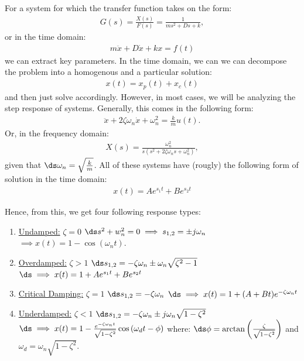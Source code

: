 \documentclass{article}
\begin{document}


For a system for which the transfer function takes on the form:
\begin{align*}
  G(s) = \frac{X(s)}{F(s)} = \frac{1}{ms^2 + Ds + k},
\end{align*}
or in the time domain:
\begin{align*}
  m\ddot{x} + D\dot{x} + kx = f(t)
\end{align*}
we can extract key parameters.
\gap
{}
In the time domain, we can we can decompose the problem into a homogenous and a particular solution:
\begin{align*}
  x(t) = x_p(t) + x_c(t)
\end{align*}
and then just solve accordingly. However, in most cases, we will be analyzing the step
response of systems. Generally, this comes in the following form:
\begin{align*}
  \ddot{x} + 2\zeta \omega_n \dot{x} + \omega_n^2 = \frac{k}{m}u(t).
\end{align*}
Or, in the frequency domain:
\begin{align*}
  X(s) = \frac{\omega_n^2}{s(s^2 + 2\zeta \omega_n s + \omega_n^2)},
\end{align*}
given that $\ds \omega_n = \sqrt{\frac{k}{m}}$. All of these systems have (rougly) the following form of solution in the time domain:
\begin{align*}
  x(t) = Ae^{s_1t} + Be^{s_2t}
\end{align*}

Hence, from this, we get four following
response types:
\begin{enumerate}
\item \underline{Undamped:} $\zeta = 0$
  \gap
  $\ds s^2 + w_n^2 = 0 \implies s_{1, 2} = \pm j \omega_n$
  \gap
  $\implies x(t) = 1 - \cos(\omega_n t)$.
\item \underline{Overdamped:} $\zeta > 1$
  \gap
  $\ds s_{1, 2} = -\zeta \omega_n  \pm \omega_n \sqrt{\zeta^2 -1}$
  \gap
  $\ds \implies x(t) = 1 + Ae^{s_1t} + Be^{s_2t}$
\item \underline{Critical Damping:} $\zeta = 1$
  \gap
  $\ds s_{1, 2} = -\zeta \omega_n$
  \gap
  $\ds \implies x(t) = 1 + (A + Bt)e^{-\zeta \omega_n t}$
\item \underline{Underdamped:} $\zeta < 1$
  \gap
  $\ds s_{1, 2} = -\zeta \omega_n \pm j \omega_n \sqrt{1 - \zeta^2}$
  \gap
  $\ds \implies x(t) = 1 - \frac{e^{-\zeta \omega_n t}}{\sqrt{1- \zeta^2}}\cos \left(\omega_d t - \phi\right) $\gap
  where: $\ds \phi = \arctan \left(\frac{\zeta}{\sqrt{1-\zeta^2}}\right)$ and $\omega_d = \omega_n \sqrt{1-\zeta^2}$.
\end{enumerate}
\end{document}
